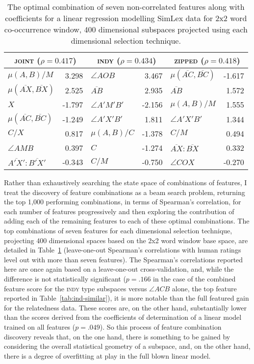 \begin{table}
\centering
\begin{tabular}{lr|lr|lr}
\hline
\multicolumn{2}{c}{\textsc{joint} ($\rho = 0.417$)} & \multicolumn{2}{c}{\textsc{indy} ($\rho = 0.434$)} & \multicolumn{2}{c}{\textsc{zipped} ($\rho = 0.418$)} \\
\hline
$\mu(A,B)/M$ & 3.298 & $\angle AOB$ & 3.467 & $\mu(\overline{AC},\overline{BC})$ & -1.617 \\
$\mu(\overline{AX},\overline{BX})$ & 2.525 & $\overline{AB}$ & 2.935 & $\overline{AB}$ & 1.572 \\
$X$ & -1.797 & $\angle A'M'B'$ & -2.156 & $\mu(A,B)/M$ & 1.555 \\
$\mu(\overline{AC},\overline{BC})$ & -1.249 & $\angle A'X'B'$ & 1.811 & $\angle A'X'B'$ & 1.344 \\
$C/X$ & 0.817 & $\mu(A,B)/C$ & -1.378 & $C/M$ & 0.494 \\
$\angle AMB$ & 0.397 & $C$ & -1.274 & $\overline{AX}:\overline{BX}$ & 0.332 \\
$\overline{A'X'}:\overline{B'X'}$ & -0.343 & $C/M$ & -0.750 & $\angle COX$ & -0.270 \\
\hline
\end{tabular}
\caption[Optimal Feature Vectors for Similarity]{The optimal combination of seven non-correlated features along with coefficients for a linear regression modelling SimLex data for 2x2 word co-occurrence window, 400 dimensional subspaces projected using each dimensional selection technique.}
\label{tab:fivelated}
\end{table}

Rather than exhaustively searching the state space of combinations of features, I treat the discovery of feature combinations as a beam search problem, returning the top 1,000 performing combinations, in terms of Spearman's correlation, for each number of features progressively and then exploring the contribution of adding each of the remaining features to each of these optimal combinations.  The top combinations of seven features for each dimensional selection technique, projecting 400 dimensional spaces based on the 2x2 word window base space, are detailed in Table~\ref{tab:fivelated} (leave-one-out Spearman's correlations with human ratings level out with more than seven features).  The Spearman's correlations reported here are once again based on a leave-one-out cross-validation, and, while the difference is not statistically significant ($p =.166$ in the case of the combined feature score for the \textsc{indy} type subspaces versus $\angle ACB$ alone, the top feature reported in Table~\ref{tab:ind-similar}), it is more notable than the full featured gain for the relatedness data.  These scores are, on the other hand, substantially lower than the scores derived from the coefficients of determination of a linear model trained on all features ($p = .049$).  So this process of feature combination discovery reveals that, on the one hand, there is something to be gained by considering the overall statistical geometry of a subspace, and, on the other hand, there is a degree of overfitting at play in the full blown linear model.

